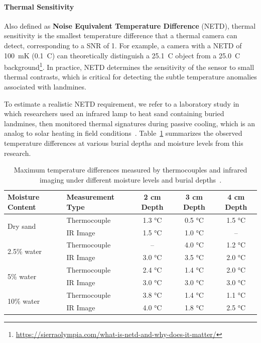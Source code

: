 \paragraph{Thermal Sensitivity}

Also defined as \textbf{Noise Equivalent Temperature Difference} (NETD), thermal sensitivity is the smallest temperature difference that a thermal camera can detect, corresponding to a \gls{SNR} of 1. For example, a camera with a \gls{NETD} of 100~mK (0.1~\textdegree C) can theoretically distinguish a 25.1~\textdegree C object from a 25.0~\textdegree C background\footnote{\url{https://sierraolympia.com/what-is-netd-and-why-does-it-matter/}}. In practice, \gls{NETD} determines the sensitivity of the sensor to small thermal contrasts, which is critical for detecting the subtle temperature anomalies associated with landmines.

To estimate a realistic \gls{NETD} requirement, we refer to a laboratory study in which researchers used an infrared lamp to heat sand containing buried landmines, then monitored thermal signatures during passive cooling, which is an analog to solar heating in field conditions~\cite{lamorski2002thermal}. Table~\ref{tab:netd_table} summarizes the observed temperature differences at various burial depths and moisture levels from this research.


\begin{table}[H]
    \centering
    \footnotesize
    \renewcommand{\arraystretch}{1}
    \setlength{\tabcolsep}{6pt}
    \caption{Maximum temperature differences measured by thermocouples and infrared imaging under different moisture levels and burial depths~\cite{lamorski2002thermal}.}
    \label{tab:netd_table}
    \begin{tabular}{llccc}
        \toprule
        \textbf{Moisture Content} & \textbf{Measurement Type} & \textbf{2 cm Depth} & \textbf{3 cm Depth} & \textbf{4 cm Depth} \\
        \midrule
        \multirow{2}{*}{Dry sand} 
            & Thermocouple & 1.3 °C & 0.5 °C & 1.5 °C \\
            & \gls{IR} Image     & 1.5 °C & 1.0 °C & -- \\
        \midrule
        \multirow{2}{*}{2.5\% water} 
            & Thermocouple & --     & 4.0 °C & 1.2 °C \\
            & \gls{IR} Image     & 3.0 °C & 3.5 °C & 2.0 °C \\
        \midrule
        \multirow{2}{*}{5\% water} 
            & Thermocouple & 2.4 °C & 1.4 °C & 2.0 °C \\
            & \gls{IR} Image     & 3.0 °C & 3.0 °C & 3.0 °C \\
        \midrule
        \multirow{2}{*}{10\% water} 
            & Thermocouple & 3.8 °C & 1.4 °C & 1.1 °C \\
            & \gls{IR} Image     & 4.0 °C & 1.8 °C & 2.5 °C \\
        \bottomrule
    \end{tabular}
\end{table}


